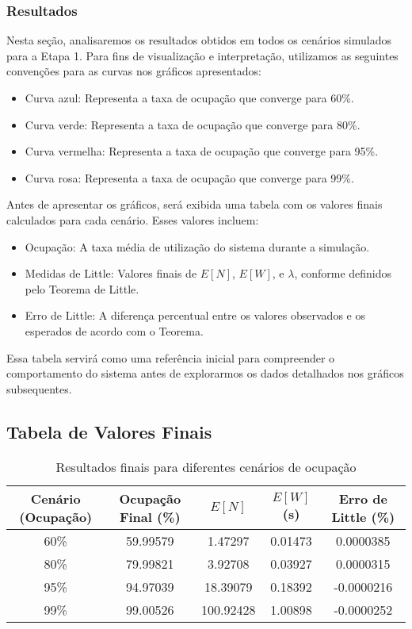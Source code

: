 \subsubsection{Resultados}
Nesta seção, analisaremos os resultados obtidos em todos os cenários simulados para a Etapa 1. Para fins de visualização e interpretação, utilizamos as seguintes convenções para as curvas nos gráficos apresentados:
\begin{itemize}
    \item Curva azul: Representa a taxa de ocupação que converge para 60\%.
    \item Curva verde: Representa a taxa de ocupação que converge para 80\%.
    \item Curva vermelha: Representa a taxa de ocupação que converge para 95\%.
    \item Curva rosa: Representa a taxa de ocupação que converge para 99\%.
\end{itemize}
Antes de apresentar os gráficos, será exibida uma tabela com os valores finais calculados para cada cenário. Esses valores incluem:
\begin{itemize}
    \item Ocupação: A taxa média de utilização do sistema durante a simulação.
    \item Medidas de Little: Valores finais de $E[N]$, $E[W]$, e $\lambda$, conforme definidos pelo Teorema de Little.
    \item Erro de Little: A diferença percentual entre os valores observados e os esperados de acordo com o Teorema.
\end{itemize}
Essa tabela servirá como uma referência inicial para compreender o comportamento do sistema antes de explorarmos os dados detalhados nos gráficos subsequentes.
\subsection{Tabela de Valores Finais}
\begin{table}[H]
    \centering
    \begin{tabular}{|c|c|c|c|c|}
        \hline
        \textbf{Cenário (Ocupação)} & \textbf{Ocupação Final (\%)} & \textbf{$E[N]$} & \textbf{$E[W]$ (s)} & \textbf{Erro de Little (\%)} \\ 
        \hline
        60\% & 59.99579 & 1.47297 & 0.01473 & 0.0000385 \\ 
        80\% & 79.99821 & 3.92708 & 0.03927 & 0.0000315 \\ 
        95\% & 94.97039 & 18.39079 & 0.18392 & -0.0000216 \\ 
        99\% & 99.00526 & 100.92428 & 1.00898 & -0.0000252 \\ 
        \hline
    \end{tabular}
    \caption{Resultados finais para diferentes cenários de ocupação}
    \label{tab:resultados}
\end{table}


